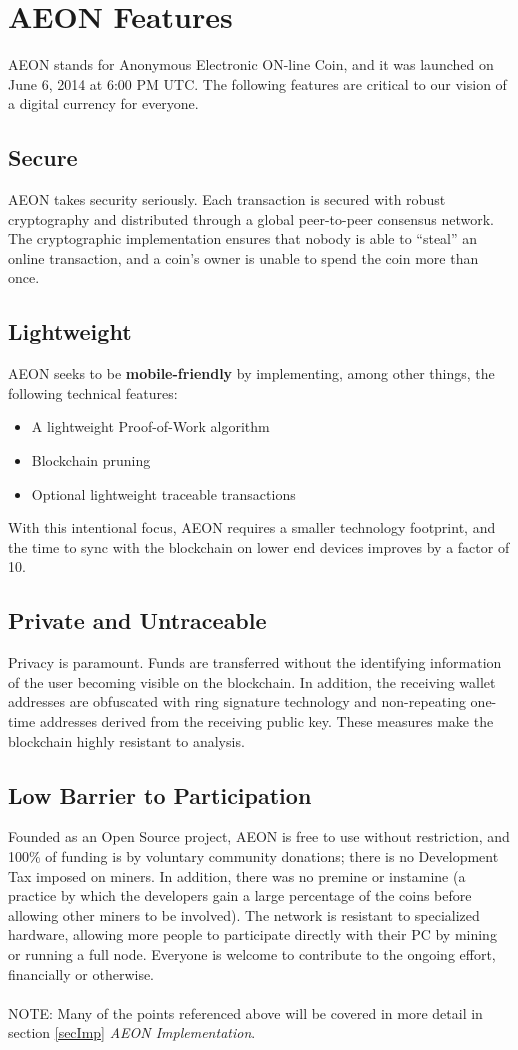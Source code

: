 \section{AEON Features}
AEON stands for Anonymous Electronic ON-line Coin, and it was launched on June 6, 2014 at 6:00 PM UTC. The following features are critical to our vision of a digital currency for everyone.

\subsection{Secure}
AEON takes security seriously.  Each transaction is secured with robust cryptography and distributed through a global peer-to-peer consensus network.  The cryptographic implementation ensures that nobody is able to “steal” an online transaction, and a coin’s owner is unable to spend the coin more than once.

\subsection{Lightweight}
AEON seeks to be \textbf{mobile-friendly} by implementing, among other things, the following technical features:
\begin{itemize}
	\item A lightweight Proof-of-Work algorithm
	\item Blockchain pruning
	\item Optional lightweight traceable transactions
\end{itemize}
With this intentional focus, AEON requires a smaller technology footprint, and the time to sync with the blockchain on lower end devices improves by a factor of 10. 

\subsection{Private and Untraceable}
Privacy is paramount. Funds are transferred without the identifying information of the user becoming visible on the blockchain. In addition, the receiving wallet addresses are obfuscated with ring signature technology and non-repeating one-time addresses derived from the receiving public key. These measures make the blockchain highly resistant to analysis.

\subsection{Low Barrier to Participation}
Founded as an Open Source project, AEON is free to use without restriction, and 100\% of funding is by voluntary community donations; there is no Development Tax imposed on miners.  In addition, there was no premine or instamine (a practice by which the developers gain a large percentage of the coins before allowing other miners to be involved). The network is resistant to specialized hardware, allowing more people to participate directly with their PC by mining or running a full node.  Everyone is welcome to contribute to the ongoing effort, financially or otherwise.\\
\\
NOTE:  Many of the points referenced above will be covered in more detail in section \ref{secImp} \textit{AEON Implementation}.